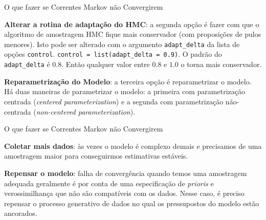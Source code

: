 \begin{frame}{O que fazer se Correntes Markov não Convergirem}
  \begin{vfilleditems}
    \item \textbf{Alterar a rotina de adaptação do HMC}: a segunda opção é fazer com
    que o algoritmo de amostragem HMC fique mais conservador
    (com proposições de pulos menores). Isto pode ser alterado com o argumento
    \texttt{adapt\_delta} da lista de opções \texttt{control}.
    \texttt{control = list(adapt\_delta = 0.9)}. O padrão do \texttt{adapt\_delta} é $0.8$.
    Então qualquer valor entre $0.8$ e $1.0$ o torna mais conservador.
    \item \textbf{Reparametrização do Modelo}: a terceira opção é reparametrizar o
    modelo. Há duas maneiras de parametrizar o modelo: a primeira com parametrização
    centrada (\textit{centered parameterization}) e a segunda com parametrização
    não-centrada (\textit{non-centered parameterization}).
  \end{vfilleditems}
\end{frame}

\begin{frame}{O que fazer se Correntes Markov não Convergirem}
  \begin{vfilleditems}
    \item \textbf{Coletar mais dados}: às vezes o modelo é complexo demais e
    precisamos de uma amostragem maior para conseguirmos estimativas estáveis.
    \item \textbf{Repensar o modelo}: falha de convergência quando temos uma
    amostragem adequada geralmente é por conta de uma especificação de \textit{prioris} e
    verossimilhança que não são compatíveis com os dados. Nesse caso, é preciso
    repensar o processo generativo de dados no qual os pressupostos do modelo
    estão ancorados.
  \end{vfilleditems}
\end{frame}
